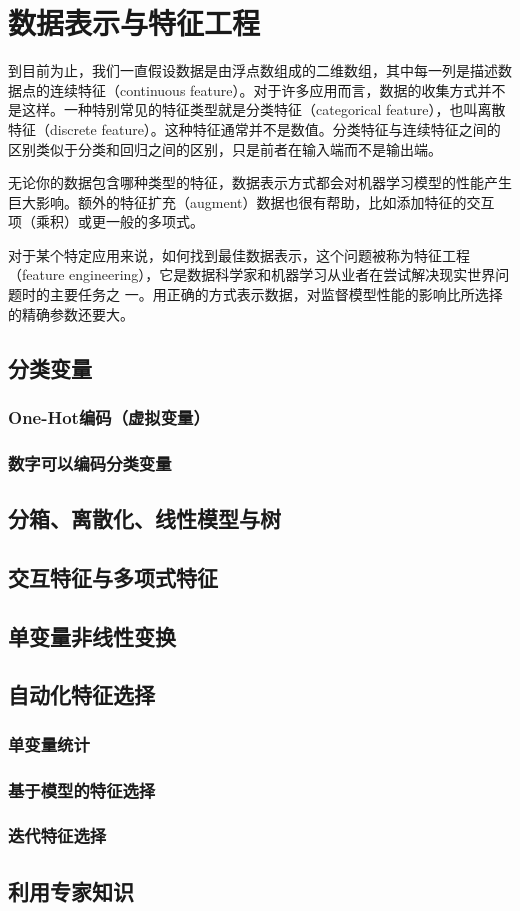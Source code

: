 \chapter{数据表示与特征工程}
到目前为止，我们一直假设数据是由浮点数组成的二维数组，其中每一列是描述数据点的连续特征（continuous feature）。对于许多应用而言，数据的收集方式并不是这样。一种特别常见的特征类型就是分类特征（categorical feature），也叫离散特征（discrete feature）。这种特征通常并不是数值。分类特征与连续特征之间的区别类似于分类和回归之间的区别，只是前者在输入端而不是输出端。

无论你的数据包含哪种类型的特征，数据表示方式都会对机器学习模型的性能产生巨大影响。额外的特征扩充（augment）数据也很有帮助，比如添加特征的交互
项（乘积）或更一般的多项式。

对于某个特定应用来说，如何找到最佳数据表示，这个问题被称为特征工程（feature
engineering），它是数据科学家和机器学习从业者在尝试解决现实世界问题时的主要任务之
一。用正确的方式表示数据，对监督模型性能的影响比所选择的精确参数还要大。
\section{分类变量}
\subsection{One-Hot编码（虚拟变量）}
\subsection{数字可以编码分类变量}
\section{分箱、离散化、线性模型与树}
\section{交互特征与多项式特征}
\section{单变量非线性变换}
\section{自动化特征选择}
\subsection{单变量统计}
\subsection{基于模型的特征选择}
\subsection{迭代特征选择}
\section{利用专家知识}
